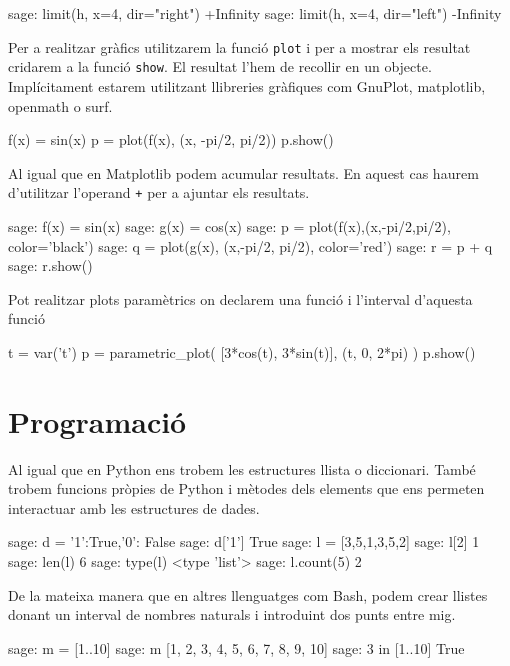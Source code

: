 \begin{blockcode}
sage: limit(h, x=4, dir="right")
+Infinity
sage: limit(h, x=4, dir="left")
-Infinity
\end{blockcode}


Per a realitzar gràfics utilitzarem la funció {\tt plot} i per a mostrar els resultat cridarem a la funció {\tt show}. El resultat l'hem de recollir en un objecte. Implícitament estarem utilitzant llibreries gràfiques com GnuPlot, matplotlib, openmath o surf.


\begin{blockcode}
f(x) = sin(x)
p = plot(f(x), (x, -pi/2, pi/2))
p.show()
\end{blockcode}

Al igual que en Matplotlib podem acumular resultats. En aquest cas haurem d'utilitzar l'operand {\tt +} per a ajuntar els resultats.

\begin{blockcode}
sage: f(x) = sin(x)
sage: g(x) = cos(x)
sage: p = plot(f(x),(x,-pi/2,pi/2), color='black')
sage: q = plot(g(x), (x,-pi/2, pi/2), color='red')
sage: r = p + q
sage: r.show()
\end{blockcode}

Pot realitzar plots paramètrics on declarem una funció i l'interval d'aquesta funció
\begin{blockcode}
t = var('t')
p = parametric_plot( [3*cos(t), 3*sin(t)], (t, 0, 2*pi) )
p.show()
\end{blockcode}


\section{Programació}

Al igual que en Python ens trobem les estructures llista o diccionari. També trobem funcions pròpies de Python i mètodes dels elements que ens permeten interactuar amb les estructures de dades.

\begin{blockcode}
sage: d = {'1':True,'0': False}
sage: d['1']
True
sage: l = [3,5,1,3,5,2]
sage: l[2]
1
sage: len(l)
6
sage: type(l)
<type 'list'>
sage: l.count(5)
2
\end{blockcode}

De la mateixa manera que en altres llenguatges com Bash, podem crear llistes donant un interval de nombres naturals i introduint dos punts entre mig.

\begin{blockcode}
sage: m = [1..10]
sage: m
[1, 2, 3, 4, 5, 6, 7, 8, 9, 10]
sage: 3 in [1..10]
True
\end{blockcode}


